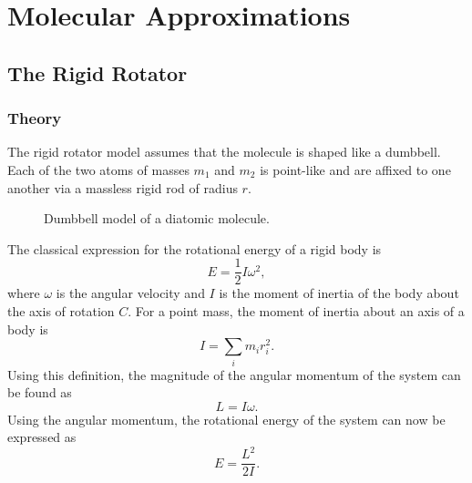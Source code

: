 \chapter{Molecular Approximations}
\label{c:molecular_approximations}

\section{The Rigid Rotator}
\label{s:the_rigid_rotator}

\subsection{Theory}

The rigid rotator model assumes that the molecule is shaped like a dumbbell. Each of the two atoms of masses $m_{1}$ and $m_{2}$ is point-like and are affixed to one another via a massless rigid rod of radius $r$.

\begin{figure}[H]
    \centering
    \caption{Dumbbell model of a diatomic molecule.}
    \label{f:dumbbell_model}
\end{figure}

The classical expression for the rotational energy of a rigid body is
\begin{equation*}
    E = \frac{1}{2}I\omega^{2},
\end{equation*}
where $\omega$ is the angular velocity and $I$ is the moment of inertia of the body about the axis of rotation $C$. For a point mass, the moment of inertia about an axis of a body is
\begin{equation*}
    I = \sum_{i} m_{i} r_{i}^{2}.
\end{equation*}
Using this definition, the magnitude of the angular momentum of the system can be found as
\begin{equation*}
    L = I\omega.
\end{equation*}
Using the angular momentum, the rotational energy of the system can now be expressed as
\begin{equation*}
    E = \frac{L^{2}}{2I}.
\end{equation*}

